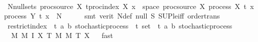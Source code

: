\begin{isabellebody}
\ \ \isamarkupfalse%
\ \isamarkupfalse%
\ {\isachardoublequoteopen}{\isasymexists}N{\isasymin}null{\isacharunderscore}{\kern0pt}sets\ {\isacharparenleft}{\kern0pt}proc{\isacharunderscore}{\kern0pt}source\ X{\isacharparenright}{\kern0pt}{\isachardot}{\kern0pt}\ {\isasymforall}t{\isasymin}proc{\isacharunderscore}{\kern0pt}index\ X{\isachardot}{\kern0pt}\ {\isacharbraceleft}{\kern0pt}x\ {\isasymin}\ space\ {\isacharparenleft}{\kern0pt}proc{\isacharunderscore}{\kern0pt}source\ X{\isacharparenright}{\kern0pt}{\isachardot}{\kern0pt}\ process\ X\ t\ x\ {\isasymnoteq}\ process\ Y\ t\ x{\isacharbraceright}{\kern0pt}\ {\isasymsubseteq}\ N{\isachardoublequoteclose}\isanewline
\ \ \ \ \isamarkupfalse%
\ {\isacharparenleft}{\kern0pt}smt\ {\isacharparenleft}{\kern0pt}verit{\isacharparenright}{\kern0pt}\ N{\isacharunderscore}{\kern0pt}def\ null\ S\ SUP{\isacharunderscore}{\kern0pt}le{\isacharunderscore}{\kern0pt}iff\ order{\isacharunderscore}{\kern0pt}trans{\isacharparenright}{\kern0pt}\isanewline
{}\isamarkupfalse%
%
\endisatagproof
{\isafoldproof}%
%
\isadelimproof
%
\endisadelimproof
\isanewline
\isanewline
{}\isamarkupfalse%
\ restrict{\isacharunderscore}{\kern0pt}index\ {\isacharcolon}{\kern0pt}{\isacharcolon}{\kern0pt}\ {\isachardoublequoteopen}{\isacharparenleft}{\kern0pt}{\isacharprime}{\kern0pt}t{\isacharcomma}{\kern0pt}\ {\isacharprime}{\kern0pt}a{\isacharcomma}{\kern0pt}\ {\isacharprime}{\kern0pt}b{\isacharparenright}{\kern0pt}\ stochastic{\isacharunderscore}{\kern0pt}process\ {\isasymRightarrow}\ {\isacharprime}{\kern0pt}t\ set\ {\isasymRightarrow}\ {\isacharparenleft}{\kern0pt}{\isacharprime}{\kern0pt}t{\isacharcomma}{\kern0pt}\ {\isacharprime}{\kern0pt}a{\isacharcomma}{\kern0pt}\ {\isacharprime}{\kern0pt}b{\isacharparenright}{\kern0pt}\ stochastic{\isacharunderscore}{\kern0pt}process{\isachardoublequoteclose}\isanewline
\ \ {\isachardoublequoteopen}{\isasymlambda}{\isacharparenleft}{\kern0pt}M{\isacharcomma}{\kern0pt}\ M{\isacharprime}{\kern0pt}{\isacharcomma}{\kern0pt}\ I{\isacharcomma}{\kern0pt}\ X{\isacharparenright}{\kern0pt}\ T{\isachardot}{\kern0pt}\ {\isacharparenleft}{\kern0pt}M{\isacharcomma}{\kern0pt}\ M{\isacharprime}{\kern0pt}{\isacharcomma}{\kern0pt}\ T{\isacharcomma}{\kern0pt}\ X{\isacharparenright}{\kern0pt}{\isachardoublequoteclose}%
\isadelimproof
\ %
\endisadelimproof
%
\isatagproof
{}\isamarkupfalse%
\ fast%
\endisatagproof
{\isafoldproof}%
%
\isadelimproof
%
\endisadelimproof
\isanewline
\isanewline

\end{isabellebody}
